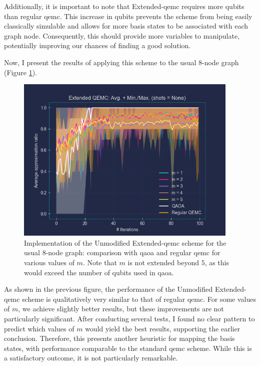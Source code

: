 Additionally, it is important to note that Extended-\acrshort{qemc} requires more qubits than regular \acrshort{qemc}. This increase in qubits prevents the scheme from being easily classically simulable and allows for more basis states to be associated with each graph node. Consequently, this should provide more variables to manipulate, potentially improving our chances of finding a good solution.

Now, I present the results of applying this scheme to the usual $8$-node graph (Figure \ref{fig:Vanilla_Extended-QEMC}).
\begin{figure}[h]
    \centering
    \includegraphics[width=0.95\textwidth]{Figures/Chapter_5/Extended-QEMC/8-node(n_layers=3, step_size=0.95, m=All).png}
    \caption{Implementation of the Unmodified Extended-\acrshort{qemc} scheme for the usual $8$-node graph: comparison with \acrshort{qaoa} and regular \acrshort{qemc} for various values of $m$. Note that $m$ is not extended beyond $5$, as this would exceed the number of qubits used in \acrshort{qaoa}.}
    \label{fig:Vanilla_Extended-QEMC}
\end{figure}

As shown in the previous figure, the performance of the Unmodified Extended-\acrshort{qemc} scheme is qualitatively very similar to that of regular \acrshort{qemc}. For some values of $m$, we achieve slightly better results, but these improvements are not particularly significant. After conducting several tests, I found no clear pattern to predict which values of $m$ would yield the best results, supporting the earlier conclusion. Therefore, this presents another heuristic for mapping the basis states, with performance comparable to the standard \acrshort{qemc} scheme. While this is a satisfactory outcome, it is not particularly remarkable.

